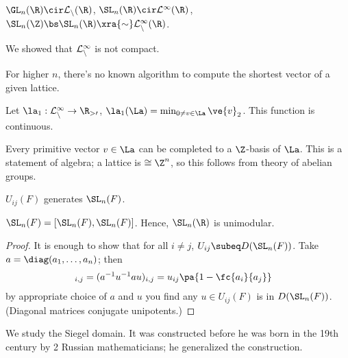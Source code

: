 
$\GL_n(\R)\cir \cal L_n(\R)$, $\SL_n(\R) \cir \cal L^1(\R)$, $\SL_n(\Z)\bs \SL_n(\R) \xra{\sim} \cal L_n^1(\R)$. 

We showed that $\cal L_n^1$ is not compact. 


For higher $n$, there's no known algorithm to compute the shortest vector of a given lattice.

\begin{pr}
Let $\la_1:\cal L_n^1 \to \R_{>0}$, $\la_1(\La) = \min_{0\ne v\in \La} \ve{v}_2$. This function is continuous. 
\end{pr}
Every primitive vector $v\in \La$ can be completed to a $\Z$-basis of $\La$. This is a statement of algebra; a lattice is $\cong \Z^n$, so this follows from theory of abelian groups.

\begin{pr}
$U_{ij}(F)$ generates $\SL_n(F)$. 
\end{pr}
\begin{cor}
$\SL_n(F) = [\SL_n(F), \SL_n(F)]$. Hence, $\SL_n(\R)$ is unimodular. 
\end{cor}
\begin{proof}
It is enough to show that for all $i\ne j$, $U_{ij}\subeq D(\SL_n(F))$. Take $a=\diag(a_1,\ldots, a_n)$; then
\begin{align}
[a,u]_{i,j} &= (a^{-1}u^{-1}au)_{i,j} = u_{ij} \pa{1-\fc{a_i}{a_j}}
\end{align}
by appropriate choice of $a$ and $u$ you find any $u\in U_{ij}(F)$ is in $D(\SL_n(F))$. 
(Diagonal matrices conjugate unipotents.)
\end{proof}

We study the Siegel domain. It was constructed before he was born in the 19th century by 2 Russian mathematicians; he generalized the construction.

